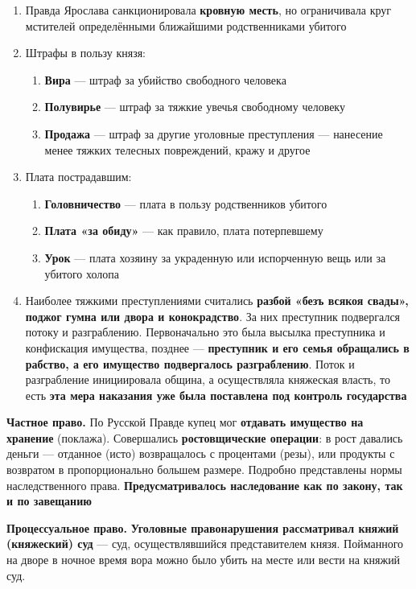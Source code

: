 \documentclass{article}
\begin{document}
\begin{enumerate}
    \item Правда Ярослава санкционировала \textbf{кровную месть}, но ограничивала круг мстителей определёнными ближайшими родственниками убитого
    \item Штрафы в пользу князя:
    \begin{enumerate}
        \item \textbf{Вира} — штраф за убийство свободного человека
        \item \textbf{Полувирье} — штраф за тяжкие увечья свободному человеку
        \item \textbf{Продажа} — штраф за другие уголовные преступления — нанесение менее тяжких телесных повреждений, кражу и другое
    \end{enumerate}
    \item Плата пострадавшим:
    \begin{enumerate}
        \item \textbf{Головничество} — плата в пользу родственников убитого
        \item \textbf{Плата «за обиду»} — как правило, плата потерпевшему
        \item \textbf{Урок} — плата хозяину за украденную или испорченную вещь или за убитого холопа
    \end{enumerate}
    \item Наиболее тяжкими преступлениями считались \textbf{разбой «безъ всякоя свады», поджог гумна или двора и конокрадство}. За них преступник подвергался потоку и разграблению. Первоначально это была высылка преступника и конфискация имущества, позднее — \textbf{преступник и его семья обращались в рабство, а его имущество подвергалось разграблению}. Поток и разграбление инициировала община, а осуществляла княжеская власть, то есть \textbf{эта мера наказания уже была поставлена под контроль государства}
\end{enumerate}

\hfill

\textbf{Частное право.} По Русской Правде купец мог \textbf{отдавать имущество на хранение} (поклажа). Совершались \textbf{ростовщические операции}: в рост давались деньги — отданное (исто) возвращалось с процентами (резы), или продукты с возвратом в пропорционально большем размере. Подробно представлены нормы наследственного права. \textbf{Предусматривалось наследование как по закону, так и по завещанию}

\hfill

\textbf{Процессуальное право.} \textbf{Уголовные правонарушения рассматривал княжий (княжеский) суд} — суд, осуществлявшийся представителем князя. Пойманного на дворе в ночное время вора можно было убить на месте или вести на княжий суд.
\end{document}
